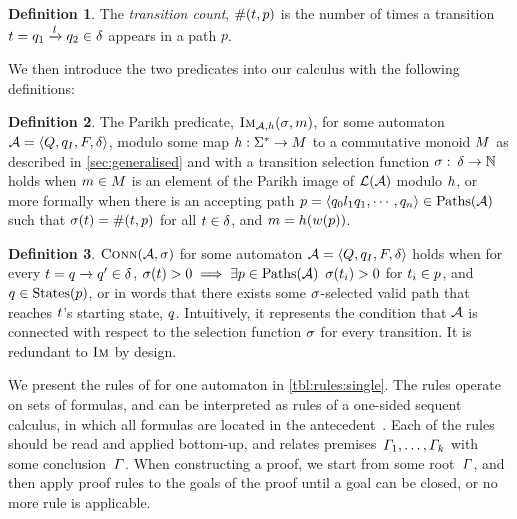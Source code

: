 \documentclass[acmsmall,review,anonymous,screen]{acmart}\settopmatter{printfolios=true,printccs=true,printacmref=true}
\theoremstyle{definition}
\newtheorem{definition}{Definition}[section]
\begin{document}
\begin{definition}
 The \textit{transition count}, $\operatorname{\#}(t, p)$ is the
 number of times a transition $t =
 q_1 \xrightarrow{l} q_2 \in \delta$ appears in a path
 $p$.
\end{definition}

We then introduce the two predicates into our calculus with the following
definitions:

\begin{definition}\label{def:single-image}
  The Parikh predicate, $\operatorname{\textsc{Im}}_{\mathcal{A}, h}(\operatorname{\sigma}, m)$, for some automaton
  $\mathcal{A} = \left\langle Q, q_I, F, \delta\right\rangle$, modulo some map $h : \Sigma^* \to M$ to a
  commutative monoid $M$ as described in \cref{sec:generalised}
  and with a transition selection function
  $\operatorname{\sigma}:\: \delta \to \mathbb{N}$ holds when
  $m \in M$ is an element of the Parikh image of
  $\operatorname{\mathcal{L}}(\mathcal{A})$
  modulo $h$, or more formally when there is an accepting path
  $p = \left\langle q_0 l_1 q_1 , \cdots , q_n\right\rangle \in \operatorname{Paths}(\mathcal{A})$ such
  that $\operatorname{\sigma}(t) = \operatorname{\#}(t, p)$
  for all $t \in \delta$, and $m = h(w(p))$.
\end{definition}

\begin{definition}
  $\operatorname{\textsc{Conn}}(\mathcal{A}, \operatorname{\sigma})$ for some automaton $\mathcal{A} =
  \left\langle Q, q_I, F, \delta\right\rangle$ holds when for every $t =
  q \xrightarrow{} q' \in \delta$, $\operatorname{\sigma}(t) > 0
  \implies \exists p \in \operatorname{Paths}(\mathcal{A})$ $\operatorname{\sigma}(t_i) > 0$
  for $t_i \in p$, and $q \in \operatorname{States}(p)$, or in words that
  there exists some $\operatorname{\sigma}$-selected valid path that reaches $t$'s
  starting state, $q$. Intuitively, it represents the condition that
  $\mathcal{A}$ is connected with respect to the selection function $\operatorname{\sigma}$ for
  every transition. It is redundant to $\operatorname{\textsc{Im}}$ by design.
\end{definition}

We present the rules of \Calculus{} for one automaton in
\cref{tbl:rules:single}. The rules operate on sets of formulas, and
can be interpreted as rules of a one-sided sequent calculus, in
which all formulas are located in the antecedent~\cite{Fitting96a}.
Each of the rules should be read and
applied bottom-up, and relates
premises~$\varGamma_1, \ldots, \varGamma_k$ with some
conclusion~$\varGamma$. When constructing a proof, we start from some
root~$\varGamma$, and then apply proof rules to the goals of the proof
until a goal can be closed, or no more rule is applicable.
\end{document}
